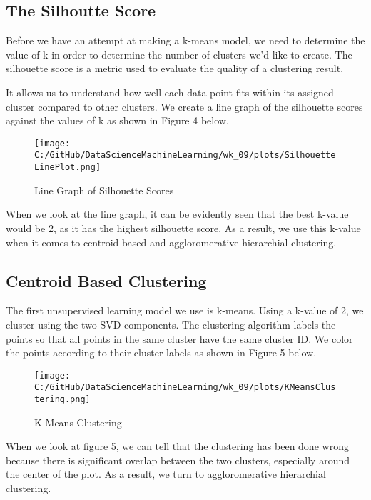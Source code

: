 \documentclass[a4paper, twocolumn]{article}
\begin{document}
\subsection{The Silhoutte Score}
Before we have an attempt at making a k-means model, we need to determine the value of k in order to determine the number of clusters we'd like to create.
The silhouette score is a metric used to evaluate the quality of a clustering result.

\noindent It allows us to understand how well each data point fits within 
its assigned cluster compared to other clusters. We create a line graph of the silhouette scores against the values of k as shown in Figure 4 below.

\begin{figure}[H]
    \centering
    \texttt{[image: C:/GitHub/DataScienceMachineLearning/wk\_09/plots/SilhouetteLinePlot.png]}
    \caption{Line Graph of Silhouette Scores}
\end{figure}

\vspace{1em}

\noindent When we look at the line graph, it can be evidently seen that the best k-value would be 2, as it has the highest silhouette score. As a result, 
we use this k-value when it comes to centroid based and aggloromerative hierarchial clustering.

\subsection{Centroid Based Clustering}
The first unsupervised learning model we use is k-means. Using a k-value of 2, we cluster using the two SVD components. The clustering algorithm labels the 
points so that all points in the same cluster have the same cluster ID. We color the points according to their cluster labels as shown in Figure 5 below.

\begin{figure}[H]
    \centering
    \texttt{[image: C:/GitHub/DataScienceMachineLearning/wk\_09/plots/KMeansClustering.png]}
    \caption{K-Means Clustering}
\end{figure}

When we look at figure 5, we can tell that the clustering has been done wrong because there is significant overlap between the two clusters, especially 
around the center of the plot. As a result, we turn to aggloromerative hierarchial clustering.
\end{document}
